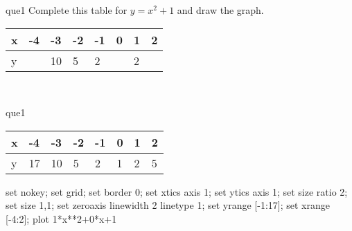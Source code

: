 \documentclass[13.5pt, varwidth=true]{beamer}
\begin{document}
\begin{frame}[shrink=19,fragile]
	\begin{beamercolorbox}[rounded=true, left, shadow=true,wd=14.8cm]{que1}
		 Complete this table for $y = x^{2} + 1$ and draw the graph. \\[0.3cm] \renewcommand{\arraystretch}{1.2}\begin{tabular}{|C|C|C|C|C|C|C|C|} \hline x & -4 & -3 & -2 & -1 & 0 & 1 & 2 \\ \hline y &  & 10 & 5 & 2 &  & 2 & \\ \hline \end{tabular}\\[0.3cm]
	\end{beamercolorbox}
\end{frame}
\begin{frame}[shrink=19,fragile]
	\begin{beamercolorbox}[rounded=true, left, shadow=true,wd=14.8cm]{que1}
		\renewcommand{\arraystretch}{1.2}\begin{tabular}{|C|C|C|C|C|C|C|C|} \hline x & -4 & -3 & -2 & -1 & 0 & 1 & 2 \\ \hline y & 17 & 10 & 5 & 2 & 1 & 2 & 5\\ \hline \end{tabular}\begin{gnuplot}[terminal=pdf] set nokey; set grid; set border 0; set xtics axis 1; set ytics axis 1; set size ratio 2; set size 1,1; set zeroaxis linewidth 2 linetype 1; set yrange [-1:17]; set xrange [-4:2]; plot 1*x**2+0*x+1 \end{gnuplot}
	\end{beamercolorbox}
\end{frame}
\end{document}
